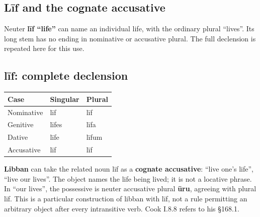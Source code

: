 \subsection*{Līf and the cognate accusative}

Neuter \textbf{līf “life”} can name an individual life, with the ordinary plural “lives”. Its long stem has no ending in nominative or accusative plural. The full declension is repeated here for this use.

\subsection*{līf: complete declension}

\par\begingroup
\fontsize{10.5}{13.2}\selectfont
\setlength{\LTleft}{0pt}\setlength{\LTright}{\fill}
\noindent
\begin{tabular}{@{}>{\raggedright\arraybackslash}p{39.46mm}>{\raggedright\arraybackslash}p{39.46mm}>{\raggedright\arraybackslash}p{39.46mm}@{}}
\toprule
\textbf{Case} & \textbf{Singular} & \textbf{Plural} \\
\midrule
Nominative & līf & līf \\
Genitive & līfes & līfa \\
Dative & līfe & līfum \\
Accusative & līf & līf \\
\bottomrule
\end{tabular}
\par\endgroup

\textbf{Libban} can take the related noun līf as a \textbf{cognate accusative}: “live one’s life”, “live our lives”. The object names the life being lived; it is not a locative phrase. In “our lives”, the possessive is neuter accusative plural \textbf{ūru}, agreeing with plural līf. This is a particular construction of libban with līf, not a rule permitting an arbitrary object after every intransitive verb. Cook I.8.8 refers to his §168.1.


